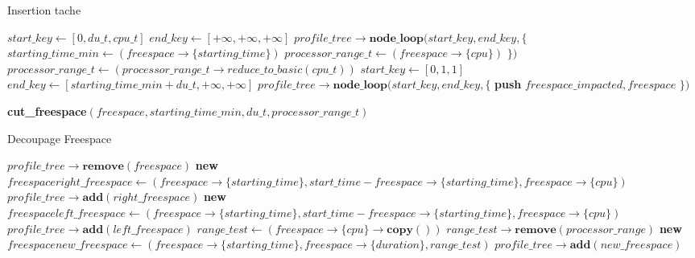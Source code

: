 \documentclass{report}
\begin{document}
\begin{algorithm}
\caption{Insertion tache}\label{insertion}
\begin{algorithmic}[1]
	\State $start\_key\gets[0, du\_t, cpu\_t]$
	\State $end\_key\gets[+\infty, +\infty, +\infty]$
	\State $profile\_tree\rightarrow \textbf{node\_loop}(start\_key, end\_key, \{$
		\State \hspace{\algorithmicindent} $starting\_time\_min\gets (freespace\rightarrow\{starting\_time\})$
		\State \hspace{\algorithmicindent} $processor\_range\_t\gets (freespace\rightarrow\{cpu\})$
		\State \hspace{\algorithmicindent} 
	\State $\})$
	\State {}
	\State $processor\_range\_t\gets (processor\_range\_t\rightarrow reduce\_to\_basic(cpu\_t))$
	\State $start\_key\gets[0, 1, 1]$
	\State $end\_key\gets[starting\_time\_min + du\_t, +\infty, +\infty]$
	\State $profile\_tree\rightarrow \textbf{node\_loop}(start\_key, end\_key, \{$
		\State \hspace{\algorithmicindent} \textbf{push} $freespace\_impacted, freespace$
		\State \hspace{\algorithmicindent} 
	\State $\})$
	
		\State \textbf{cut\_freespace}$(freespace, starting\_time\_min, du\_t, processor\_range\_t)$
	\EndFor
\EndFunction
\end{algorithmic}
\end{algorithm}

\begin{algorithm}
\caption{Decoupage Freespace}\label{cut_freespace}
\begin{algorithmic}[1]
		\State $profile\_tree\rightarrow \textbf{remove}(freespace)$
			\State \textbf{new} $freespace right\_freespace\gets(freespace\rightarrow\{starting\_time\},start\_time - freespace\rightarrow\{starting\_time\}, freespace\rightarrow\{cpu\})$
			\State $profile\_tree\rightarrow \textbf{add}(right\_freespace)$
		\EndIf
			\State \textbf{new} $freespace left\_freespace\gets(freespace\rightarrow\{starting\_time\},start\_time - freespace\rightarrow\{starting\_time\}, freespace\rightarrow\{cpu\})$
			\State $profile\_tree\rightarrow \textbf{add}(left\_freespace)$
		\EndIf
		\State $range\_test \gets (freespace\rightarrow\{cpu\}\rightarrow \textbf{copy}())$
		\State $range\_test\rightarrow \textbf{remove}(processor\_range)$
			\State \textbf{new} $freespace new\_freespace\gets(freespace\rightarrow\{starting\_time\}, freespace\rightarrow\{duration\}, range\_test)$
			\State $profile\_tree\rightarrow \textbf{add}(new\_freespace)$
		\EndIf
	\EndIf
\EndFunction
\end{algorithmic}
\end{algorithm}
\end{document}

